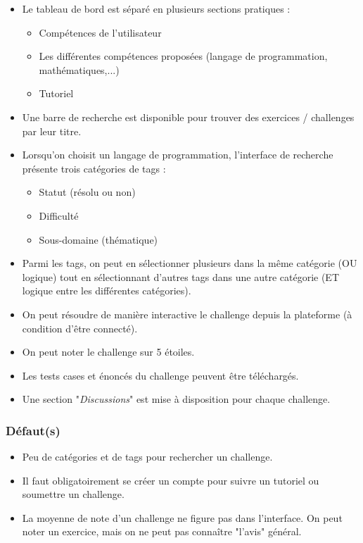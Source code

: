 \begin{itemize}
    \item Le tableau de bord est séparé en plusieurs sections pratiques :
    \begin{itemize}
        \item Compétences de l'utilisateur
        \item Les différentes compétences proposées (langage de programmation, mathématiques,...)
        \item Tutoriel
    \end{itemize}
    \item Une barre de recherche est disponible pour trouver des exercices / challenges par leur titre.
    \item Lorsqu'on choisit un langage de programmation, l'interface de recherche présente trois catégories de \glspl{tag} :
    \begin{itemize}
        \item Statut (résolu ou non)
        \item Difficulté
        \item Sous-domaine (thématique)
    \end{itemize}
    \item Parmi les \glspl{tag}, on peut en sélectionner plusieurs dans la même catégorie (OU logique) tout en sélectionnant d'autres \glspl{tag} dans une autre catégorie (ET logique entre les différentes catégories).
    \item On peut résoudre de manière interactive le challenge depuis la plateforme (à condition d'être connecté).
    \item On peut noter le challenge sur 5 étoiles.
    \item Les tests cases et énoncés du challenge peuvent être téléchargés.
    \item Une section "\textit{Discussions}" est mise à disposition pour chaque challenge.
\end{itemize}

\subsubsection*{Défaut(s)}

\begin{itemize}
    \item Peu de catégories et de \glspl{tag} pour rechercher un challenge.
    \item Il faut obligatoirement se créer un compte pour suivre un tutoriel ou soumettre un challenge.
    \item La moyenne de note d'un challenge ne figure pas dans l'interface. On peut noter un exercice, mais on ne peut pas connaître "l'avis" général.
\end{itemize}

